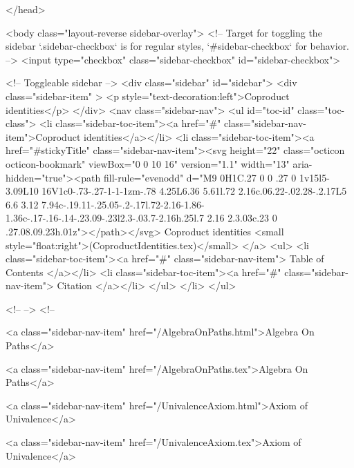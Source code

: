 </head>


  <body class="layout-reverse sidebar-overlay">
    <!-- Target for toggling the sidebar `.sidebar-checkbox` is for regular
     styles, `#sidebar-checkbox` for behavior. -->
<input type="checkbox" class="sidebar-checkbox" id="sidebar-checkbox">

<!-- Toggleable sidebar -->
<div class="sidebar" id="sidebar">
  <div class="sidebar-item" >
    <p style="text-decoration:left">Coproduct identities</p>
  </div>
  <nav class="sidebar-nav">
    <ul id="toc-id" class="toc-class">
  <li class="sidebar-toc-item"><a href="#" class="sidebar-nav-item">Coproduct identities</a></li>
  <li class="sidebar-toc-item"><a href="#stickyTitle" class="sidebar-nav-item"><svg height="22" class="octicon octicon-bookmark" viewBox="0 0 10 16" version="1.1" width="13" aria-hidden="true"><path fill-rule="evenodd" d="M9 0H1C.27 0 0 .27 0 1v15l5-3.09L10 16V1c0-.73-.27-1-1-1zm-.78 4.25L6.36 5.61l.72 2.16c.06.22-.02.28-.2.17L5 6.6 3.12 7.94c-.19.11-.25.05-.2-.17l.72-2.16-1.86-1.36c-.17-.16-.14-.23.09-.23l2.3-.03.7-2.16h.25l.7 2.16 2.3.03c.23 0 .27.08.09.23h.01z"></path></svg> Coproduct identities <small style="float:right">(CoproductIdentities.tex)</small>
</a>
    <ul>
      <li class="sidebar-toc-item"><a href="#" class="sidebar-nav-item"> Table of Contents </a></li>
      <li class="sidebar-toc-item"><a href="#" class="sidebar-nav-item"> Citation </a></li>
    </ul>
  </li>
</ul>


    <!--  -->
    <!-- 
      
    
      
    
      
    
      
        
      
    
      
        
          <a class="sidebar-nav-item" href="/AlgebraOnPaths.html">Algebra On Paths</a>
        
      
    
      
        
          <a class="sidebar-nav-item" href="/AlgebraOnPaths.tex">Algebra On Paths</a>
        
      
    
      
        
          <a class="sidebar-nav-item" href="/UnivalenceAxiom.html">Axiom of Univalence</a>
        
      
    
      
        
          <a class="sidebar-nav-item" href="/UnivalenceAxiom.tex">Axiom of Univalence</a>
        
